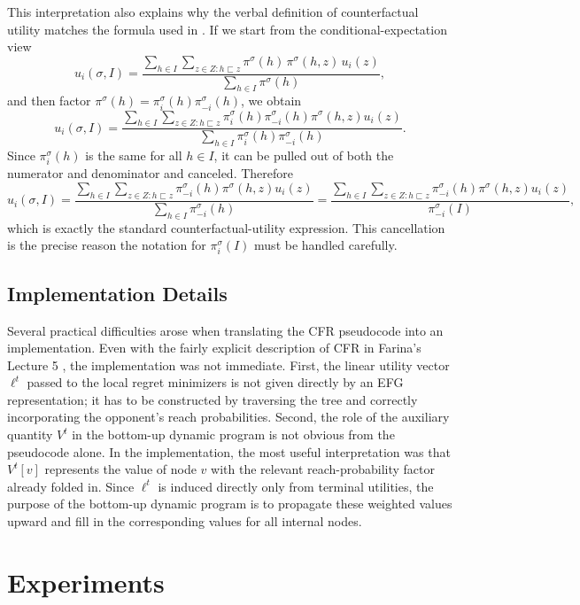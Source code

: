\documentclass[11pt]{article}
\begin{document}
This interpretation also explains why the verbal definition of counterfactual utility matches the formula used in \cite{zinkevich2007}. If we start from the conditional-expectation view
\[
u_i(\sigma, I)
=
\frac{
\sum\limits_{h \in I}
\sum\limits_{z \in Z: h \sqsubset z}
\pi^\sigma(h)\,\pi^\sigma(h, z)\,u_i(z)
}{
\sum\limits_{h \in I} \pi^\sigma(h)
},
\]
and then factor $\pi^\sigma(h) = \pi_i^\sigma(h)\pi_{-i}^\sigma(h)$, we obtain
\[
u_i(\sigma, I)
=
\frac{
\sum\limits_{h \in I}
\sum\limits_{z \in Z: h \sqsubset z}
\pi_i^\sigma(h)\pi_{-i}^\sigma(h)\pi^\sigma(h, z)u_i(z)
}{
\sum\limits_{h \in I} \pi_i^\sigma(h)\pi_{-i}^\sigma(h)
}.
\]
Since $\pi_i^\sigma(h)$ is the same for all $h \in I$, it can be pulled out of both the numerator and denominator and canceled. Therefore
\[
u_i(\sigma, I)
=
\frac{
\sum\limits_{h \in I}
\sum\limits_{z \in Z: h \sqsubset z}
\pi_{-i}^\sigma(h)\pi^\sigma(h, z)u_i(z)
}{
\sum\limits_{h \in I} \pi_{-i}^\sigma(h)
}
=
\frac{
\sum\limits_{h \in I}
\sum\limits_{z \in Z: h \sqsubset z}
\pi_{-i}^\sigma(h)\pi^\sigma(h, z)u_i(z)
}{
\pi_{-i}^\sigma(I)
},
\]
which is exactly the standard counterfactual-utility expression. This cancellation is the precise reason the notation for $\pi_i^\sigma(I)$ must be handled carefully.

\subsection{Implementation Details}

Several practical difficulties arose when translating the CFR pseudocode into an implementation. Even with the fairly explicit description of CFR in Farina's Lecture 5 \cite{farina2021}, the implementation was not immediate. First, the linear utility vector $\ell^t$ passed to the local regret minimizers is not given directly by an EFG representation; it has to be constructed by traversing the tree and correctly incorporating the opponent's reach probabilities. Second, the role of the auxiliary quantity $V^t$ in the bottom-up dynamic program is not obvious from the pseudocode alone. In the implementation, the most useful interpretation was that $V^t[v]$ represents the value of node $v$ with the relevant reach-probability factor already folded in. Since $\ell^t$ is induced directly only from terminal utilities, the purpose of the bottom-up dynamic program is to propagate these weighted values upward and fill in the corresponding values for all internal nodes.

\section{Experiments}
\end{document}

